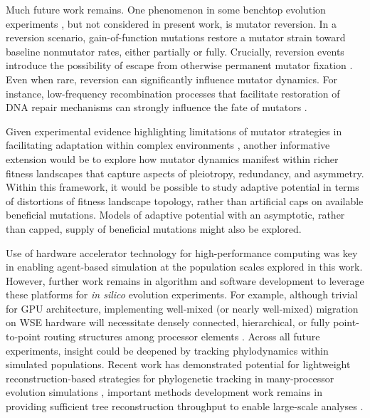 Much future work remains.
One phenomenon in some benchtop evolution experiments \citep{ho2021evolutionary}, but not considered in present work, is mutator reversion.
In a reversion scenario, gain-of-function mutations restore a mutator strain toward baseline nonmutator rates, either partially or fully.
Crucially, reversion events introduce the possibility of escape from otherwise permanent mutator fixation \citep{taddei1997role}.
Even when rare, reversion can significantly influence mutator dynamics.
For instance, low-frequency recombination processes that facilitate restoration of DNA repair mechanisms can strongly influence the fate of mutators \citep{tenaillon2000mutators}.

Given experimental evidence highlighting limitations of mutator strategies in facilitating adaptation within complex environments \citep{ho2021evolutionary}, another informative extension would be to explore how mutator dynamics manifest within richer fitness landscapes that capture aspects of pleiotropy, redundancy, and asymmetry.
Within this framework, it would be possible to study adaptive potential in terms of distortions of fitness landscape topology, rather than artificial caps on available beneficial mutations.
Models of adaptive potential with an asymptotic, rather than capped, supply of beneficial mutations might also be explored.

Use of hardware accelerator technology for high-performance computing was key in enabling agent-based simulation at the population scales explored in this work.
However, further work remains in algorithm and software development to leverage these platforms for \textit{in silico} evolution experiments.
For example, although trivial for GPU architecture, implementing well-mixed (or nearly well-mixed) migration on WSE hardware will necessitate densely connected, hierarchical, or fully point-to-point routing structures among processor elements \citep{james2020physical,luczynski2024near}.
Across all future experiments, insight could be deepened by tracking phylodynamics within simulated populations.
Recent work has demonstrated potential for lightweight reconstruction-based strategies for phylogenetic tracking in many-processor evolution simulations \citep{moreno2022hereditary}, important methods development work remains in providing sufficient tree reconstruction throughput to enable large-scale analyses \citep{moreno2024trackable}.

